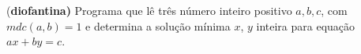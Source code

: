 \item{(\bf diofantina)}
		 Programa que lê três número inteiro positivo $a,b,c$, com $mdc(a,b)=1$ e determina a solução mínima $x$, $y$ inteira para equação $ax+by=c$.

